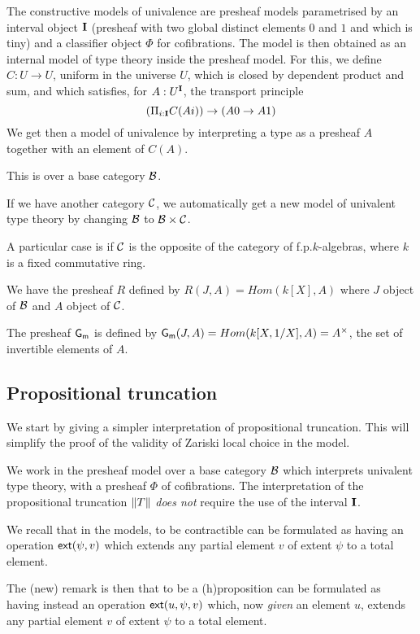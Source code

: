 The constructive models of univalence are presheaf models parametrised by an interval object $\mathbf{I}$
(presheaf with two global distinct elements $0$ and $1$ and which is tiny) and a classifier object
$\Phi$ for cofibrations. The model is then obtained as an internal model of type theory inside the
presheaf model. For this, we define $C:U\rightarrow U$, uniform in the universe $U$,
which is closed by dependent product and sum, and which satisfies, for $A:U^{\mathbf{I}}$, the transport principle
$$
(\Pi_{i:\mathbf{I}}C(Ai))\rightarrow (A0\rightarrow A1)
$$
We get then a model of univalence by interpreting a type as a presheaf $A$ together with an element
of $C(A)$.


 This is over a base category $\mathcal{B}$.
 
 If we have another category $\mathcal{C}$, we automatically get a new model of univalent type theory by
 changing $\mathcal{B}$ to $\mathcal{B}\times\mathcal{C}$.

 A particular case is if $\mathcal{C}$ is the opposite of the category of f.p.\@ $k$-algebras, where $k$ is a
 fixed commutative ring.

 We have the presheaf $R$ defined by $R(J,A) = Hom(k[X],A)$ where $J$ object of $\mathcal{B}$ and $A$ object of $\mathcal{C}$.

  The presheaf $\mathsf{G_m}$ is defined by $\mathsf{G_m}(J,A) = Hom(k[X,1/X],A) = A^{\times}$, the set of invertible elements of $A$.

\subsection{Propositional truncation}

    We start by giving a simpler interpretation of propositional truncation. This will simplify
    the proof of the validity of Zariski local choice in the model.

    We work in the presheaf model over a base category $\mathcal{B}$ which interprets univalent type theory,
    with a presheaf $\Phi$ of cofibrations. The interpretation of the propositional
    truncation $\left\lVert T \right\rVert$ {\em does not} require the use of the interval $\mathbf{I}$.

    We recall that in the models, to be contractible can be formulated as having an operation
    $\mathsf{ext}(\psi,v)$ which extends any partial element $v$ of extent $\psi$ to a total element.

    The (new) remark is then that to be a (h)proposition can be formulated as having instead
    an operation $\mathsf{ext}(u,\psi,v)$ which, now {\em given}
    an element $u$, extends any partial element $v$ of extent $\psi$ to a total element.

